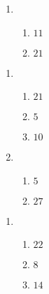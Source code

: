 \documentclass[12pt,twoside]{article}
\makeatletter
\def\emptycleardoublepage{\clearpage\if@twoside \ifodd\c@page\else
\thispagestyle{empty}%
\hbox{}\newpage\if@twocolumn\hbox{}\newpage\fi\fi\fi}
\makeatother
\begin{document}
\begin{multicols}{2}
\begin{enumerate}
\item \begin{enumerate}
\def \a{4}\def \b{7}\def \ab{11}
\item $\ab$
\def \a{6}\def \b{15}\def \apb{21}
\item $\apb$
\def \vshift{3}\def \hshift{2}\def \chang{-2}\def \findval{0}\def \yval{7}
\end{enumerate}
\end{enumerate}\end{multicols}\emptycleardoublepage{}\graphicspath{{/Users/jilan/Downloads/Randomizer/Randomizer/Sample Course/Sample Assessment 2/}}\begin{multicols}{2} \begin{enumerate}
\item \begin{enumerate}
\def \a{6}\def \b{15}\def \apb{21}
\item $\apb$
\def \a{14}\def \dif{5}\def \b{9}
\item $\dif$
\def \a{4}\def \b{6}\def \ab{10}
\item $\ab$
\def \vshift{1}\def \hshift{2}\def \chang{0}\def \findval{2}\def \yval{1}
\end{enumerate}

\item \begin{enumerate}
\def \a{14}\def \dif{5}\def \b{9}
\item $\dif$
\def \a{9}\def \b{18}\def \apb{27}
\item $\apb$
\def \vshift{-3}\def \hshift{-4}\def \chang{1}\def \findval{-3}\def \yval{-5}
\end{enumerate}
\end{enumerate}\end{multicols}\emptycleardoublepage{}\graphicspath{{/Users/jilan/Downloads/Randomizer/Randomizer/Sample Course/Sample Assessment 2/}}\begin{multicols}{2} \begin{enumerate}
\item \begin{enumerate}
\def \a{6}\def \b{16}\def \apb{22}
\item $\apb$
\def \a{11}\def \dif{8}\def \b{3}
\item $\dif$
\def \a{5}\def \b{9}\def \ab{14}
\item $\ab$
\def \vshift{-1}\def \hshift{-4}\def \chang{-2}\def \findval{-6}\def \yval{3}
\end{enumerate}


\end{enumerate}
\end{multicols}
\end{document}

